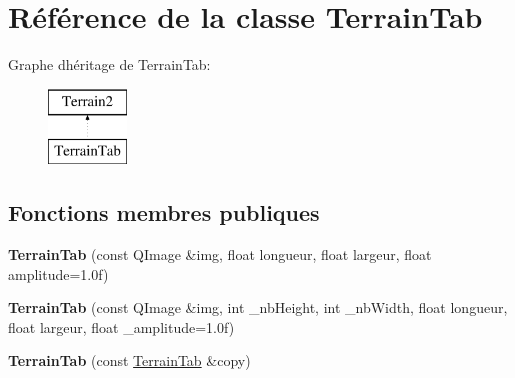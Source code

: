 \hypertarget{class_terrain_tab}{}\section{Référence de la classe Terrain\+Tab}
\label{class_terrain_tab}
Graphe d\textquotesingle{}héritage de Terrain\+Tab\+:\begin{figure}[H]
\begin{center}
\leavevmode
\includegraphics[height=2.000000cm]{class_terrain_tab}
\end{center}
\end{figure}
\subsection*{Fonctions membres publiques}
\begin{DoxyCompactItemize}
\item 
\hypertarget{class_terrain_tab_ac31e7a1fb2f33a2875de3353c3eba76a}{}{\bfseries Terrain\+Tab} (const Q\+Image \&img, float longueur, float largeur, float amplitude=1.\+0f)\label{class_terrain_tab_ac31e7a1fb2f33a2875de3353c3eba76a}

\item 
\hypertarget{class_terrain_tab_a04adc95147a7eceeac2eda0a62aa971a}{}{\bfseries Terrain\+Tab} (const Q\+Image \&img, int \+\_\+nb\+Height, int \+\_\+nb\+Width, float longueur, float largeur, float \+\_\+amplitude=1.\+0f)\label{class_terrain_tab_a04adc95147a7eceeac2eda0a62aa971a}

\item 
\hypertarget{class_terrain_tab_afb333a647c91855ed76c41cba60903f7}{}{\bfseries Terrain\+Tab} (const \hyperlink{class_terrain_tab}{Terrain\+Tab} \&copy)\label{class_terrain_tab_afb333a647c91855ed76c41cba60903f7}

\end{DoxyCompactItemize}
